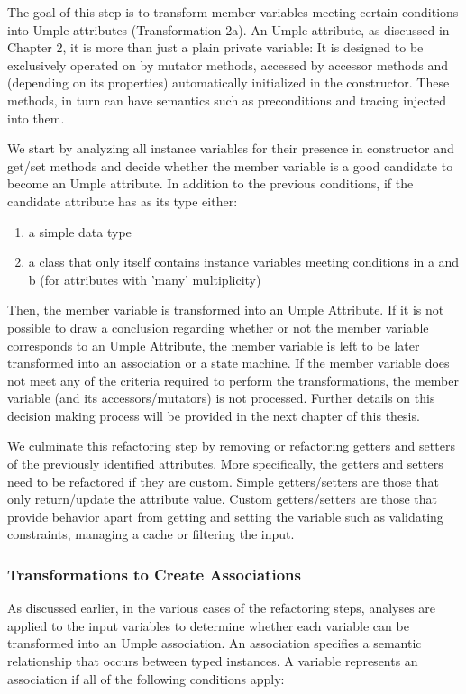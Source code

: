 The goal of this step is to transform member variables meeting certain conditions into Umple attributes (Transformation 2a). An Umple attribute, as discussed in Chapter 2, it is more than just a plain private variable: It is designed to be exclusively operated on by mutator methods, accessed by accessor methods and (depending on its properties) automatically initialized in the constructor. These methods, in turn can have semantics such as preconditions and tracing injected into them. 

We start by analyzing all instance variables for their presence in constructor and get/set methods and decide whether the member variable is a good candidate to become an Umple attribute. In addition to the previous conditions, if the candidate attribute has as its type either:

\begin{enumerate}
\item a simple data type
\item a class that only itself contains instance variables meeting conditions in a and b (for attributes with 'many' multiplicity)
\end{enumerate}

Then, the member variable is transformed into an Umple Attribute. If it is not possible to draw a conclusion regarding whether or not the member variable corresponds to an Umple Attribute, the member variable is left to be later transformed into an association or a state machine. If the member variable does not meet any of the criteria required to perform the transformations, the member variable (and its accessors/mutators) is not processed. Further details on this decision making process will be provided in the next chapter of this thesis. 

We culminate this refactoring step by removing or refactoring getters and setters of the previously identified attributes. More specifically, the getters and setters need to be refactored if they are custom. Simple getters/setters are those that only return/update the attribute value.  Custom getters/setters are those that provide behavior apart from getting and setting the variable such as validating constraints, managing a cache or filtering the input.

\subsubsection{Transformations to Create Associations}

As discussed earlier, in the various cases of the refactoring steps, analyses are applied to the input variables to determine whether each variable can be transformed into an Umple association. An association specifies a semantic relationship that occurs between typed instances. A variable represents an association if all of the following conditions apply:

